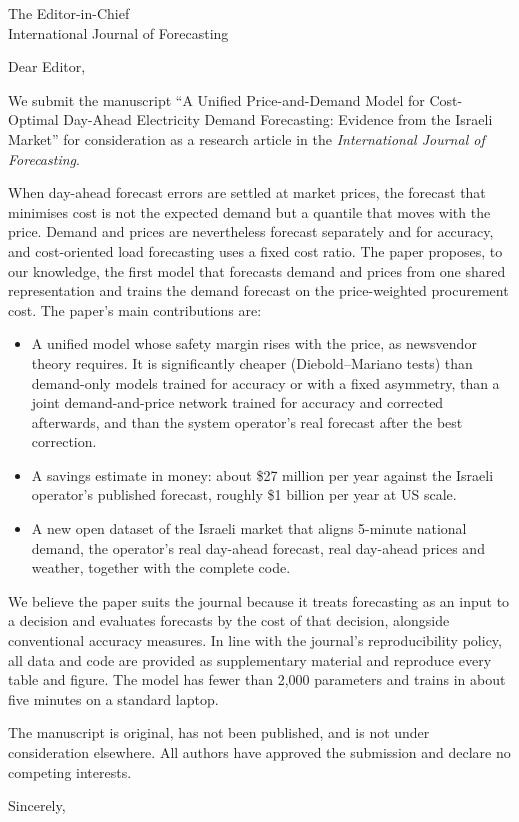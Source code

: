 \documentclass[11pt,a4paper]{letter}
\begin{document}
\begin{letter}{The Editor-in-Chief\\International Journal of Forecasting}

\opening{Dear Editor,}

We submit the manuscript ``A Unified Price-and-Demand Model for Cost-Optimal
Day-Ahead Electricity Demand Forecasting: Evidence from the Israeli Market''
for consideration as a research article in the \emph{International Journal of
Forecasting}.

When day-ahead forecast errors are settled at market prices, the forecast that
minimises cost is not the expected demand but a quantile that moves with the
price.  Demand and prices are nevertheless forecast separately and for
accuracy, and cost-oriented load forecasting uses a fixed cost ratio.  The
paper proposes, to our knowledge, the first model that forecasts demand and
prices from one shared representation and trains the demand forecast on the
price-weighted procurement cost.  The paper's main contributions are:

\begin{itemize}
    \item A unified model whose safety margin rises with the price, as
          newsvendor theory requires.  It is significantly cheaper
          (Diebold--Mariano tests) than demand-only models trained for
          accuracy or with a fixed asymmetry, than a joint demand-and-price
          network trained for accuracy and corrected afterwards, and than the
          system operator's real forecast after the best correction.
    \item A savings estimate in money: about \$27 million per year against the
          Israeli operator's published forecast, roughly \$1 billion per year
          at US scale.
    \item A new open dataset of the Israeli market that aligns 5-minute
          national demand, the operator's real day-ahead forecast, real
          day-ahead prices and weather, together with the complete code.
\end{itemize}

We believe the paper suits the journal because it treats forecasting as an
input to a decision and evaluates forecasts by the cost of that decision,
alongside conventional accuracy measures.  In line with the journal's
reproducibility policy, all data and code are provided as supplementary
material and reproduce every table and figure.  The model has fewer than
2{,}000 parameters and trains in about five minutes on a standard laptop.

The manuscript is original, has not been published, and is not under
consideration elsewhere.  All authors have approved the submission and
declare no competing interests.

\closing{Sincerely,}

\end{letter}
\end{document}
